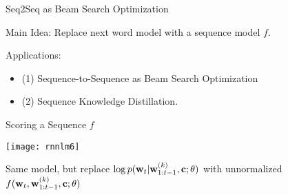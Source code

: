 
  




\begin{frame}{Seq2Seq as Beam Search Optimization}

  Main Idea: Replace next word model with a sequence model $f$. 

  
  \air 

  Applications:

  \begin{itemize}
  \item (1) Sequence-to-Sequence as Beam Search Optimization 
    \air 
  \item (2) Sequence Knowledge Distillation.
    \air 
  \end{itemize}
\end{frame}

\begin{frame}{Scoring a Sequence $f$}
  \begin{center}
    \texttt{[image: rnnlm6]}
  \end{center}

  Same model, but replace 
  $  \log p(\mathbf{w}_{t} | \mathbf{w}^{(k)}_{1:t-1}, \mathbf{c}; \theta)$
  with unnormalized 
  $f(\mathbf{w}_t, \mathbf{w}_{1:t-1}^{(k)}, \mathbf{c}; \theta)$
\end{frame}

